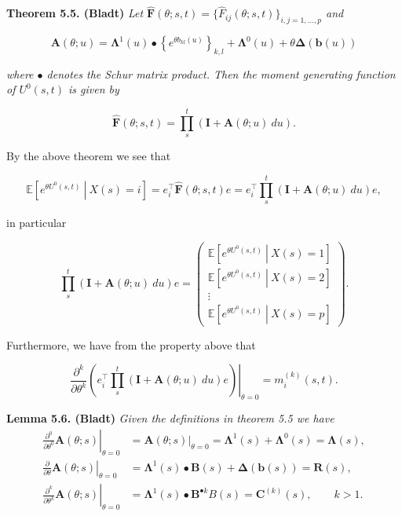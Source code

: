 \documentclass[a4paper,10pt,openany]{book}
\begin{document}
\textbf{Theorem 5.5. (Bladt)} \emph{Let \(\hat{\mathbf F}(\theta; s,t)=\{\hat F_{ij}(\theta; s,t)\}_{i,j=1,...,p}\) and}

\[
\mathbf A(\theta;u)=\mathbf\Lambda^1(u)\bullet\left\{e^{\theta b_{kl}(u)}\right\}_{k,l}+\mathbf \Lambda^0(u)+\theta \mathbf \Delta(\mathbf b(u))
\]

\emph{where \(\bullet\) denotes the Schur matrix product. Then the moment generating function of \(U^0(s,t)\) is given by}

\[
\hat{\mathbf F}(\theta; s,t)=\prod_s^t(\mathbf I + \mathbf A(\theta; u)\ du).
\]

By the above theorem we see that

\[
\mathbb E\left[\left.e^{\theta U^0(s,t)}\ \right\vert\ X(s)=i\right] =e_i^\top\hat{\mathbf F}(\theta; s,t)e = e_i^\top\prod_s^t(\mathbf I + \mathbf A(\theta; u)\ du)e,
\]

in particular

\[
\prod_s^t(\mathbf I + \mathbf A(\theta; u)\ du)e=
\begin{pmatrix}
\mathbb E\left[\left.e^{\theta U^0(s,t)}\ \right\vert\ X(s)=1\right]\\
\mathbb E\left[\left.e^{\theta U^0(s,t)}\ \right\vert\ X(s)=2\right]\\
\vdots\\
\mathbb E\left[\left.e^{\theta U^0(s,t)}\ \right\vert\ X(s)=p\right]
\end{pmatrix}.
\]

Furthermore, we have from the property above that

\[
\left.\frac{\partial^k}{\partial \theta^k}\left(e_i^\top\prod_s^t(\mathbf I + \mathbf A(\theta; u)\ du)e\right)\right\vert_{\theta = 0}=m^{(k)}_{i}(s,t).
\]

\textbf{Lemma 5.6. (Bladt)} \emph{Given the definitions in theorem 5.5 we have}
\begin{align*}
\left.\frac{\partial^0}{\partial \theta^0}\mathbf A(\theta; s)\right\vert_{\theta=0}&=\mathbf A(\theta; s)\Big\vert_{\theta=0}=\mathbf \Lambda^1(s)+\mathbf\Lambda^0(s)=\mathbf\Lambda(s),\\
\left.\frac{\partial}{\partial \theta}\mathbf A(\theta; s)\right\vert_{\theta=0}&=\mathbf \Lambda^1(s)\bullet \mathbf B(s)+\mathbf \Delta(\mathbf b(s))=\mathbf R(s),\\
\left.\frac{\partial^k}{\partial \theta^k}\mathbf A(\theta; s)\right\vert_{\theta=0}&=\mathbf \Lambda^1(s)\bullet \mathbf B^{\bullet k} B(s)=\mathbf C^{(k)}(s),\qquad k>1.
\end{align*}
\end{document}
